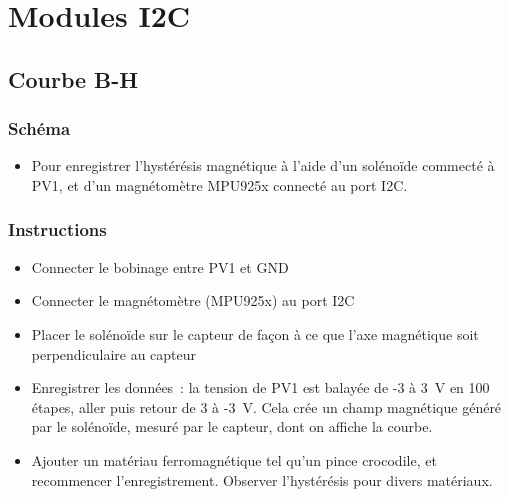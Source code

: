 \documentclass[a4paper,12pt,french]{sphinxmanual}
\begin{document}


\chapter{Modules I2C}
\label{\detokenize{index:modules-i2c}}

\section{Courbe B-H}
\label{\detokenize{6.90:courbe-b-h}}\label{\detokenize{6.90::doc}}

\subsection{Schéma}
\label{\detokenize{6.90:schema}}\begin{itemize}
\item {} 
Pour enregistrer l’hystérésis magnétique à l’aide d’un solénoïde commecté à PV1, et d’un magnétomètre MPU925x connecté au port I2C.

\end{itemize}


\subsection{Instructions}
\label{\detokenize{6.90:instructions}}\begin{itemize}
\item {} 
Connecter le bobinage entre PV1 et GND

\item {} 
Connecter le magnétomètre (MPU925x) au port I2C

\item {} 
Placer le solénoïde sur le capteur de façon à ce que l’axe magnétique soit perpendiculaire au capteur

\item {} 
Enregistrer les données : la tension de PV1 est balayée de -3 à 3 V en 100 étapes, aller puis retour de 3 à -3 V. Cela crée un champ magnétique généré par le solénoïde, mesuré par le capteur, dont on affiche la courbe.

\item {} 
Ajouter un matériau ferromagnétique tel qu’un pince crocodile, et recommencer l’enregistrement. Observer l’hystérésis pour divers matériaux.

\end{itemize}
\end{document}
